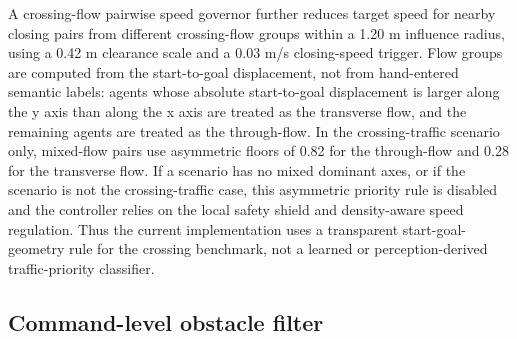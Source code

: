 \documentclass[11pt]{article}
\begin{document}
A crossing-flow pairwise speed governor further reduces target speed for nearby closing pairs from different crossing-flow groups within a 1.20 m influence radius, using a 0.42 m clearance scale and a 0.03 m/s closing-speed trigger. Flow groups are computed from the start-to-goal displacement, not from hand-entered semantic labels: agents whose absolute start-to-goal displacement is larger along the y axis than along the x axis are treated as the transverse flow, and the remaining agents are treated as the through-flow. In the crossing-traffic scenario only, mixed-flow pairs use asymmetric floors of 0.82 for the through-flow and 0.28 for the transverse flow. If a scenario has no mixed dominant axes, or if the scenario is not the crossing-traffic case, this asymmetric priority rule is disabled and the controller relies on the local safety shield and density-aware speed regulation. Thus the current implementation uses a transparent start-goal-geometry rule for the crossing benchmark, not a learned or perception-derived traffic-priority classifier.

\subsection{Command-level obstacle filter}
\end{document}
